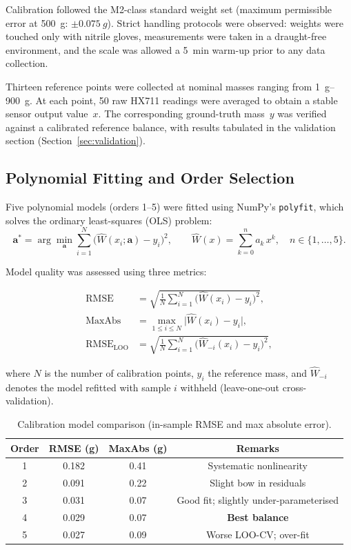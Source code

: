 \documentclass[12pt,a4paper]{article}
\begin{document}
Calibration followed the M2-class standard weight set (maximum permissible error at
\SI{500}{g}: $\pm\SI{0.075}{g}$). Strict handling protocols were observed: weights were
touched only with nitrile gloves, measurements were taken in a draught-free environment,
and the scale was allowed a \SI{5}{min} warm-up prior to any data collection.

Thirteen reference points were collected at nominal masses ranging from
\SIrange{1}{900}{g}. At each point, 50 raw HX711 readings were averaged to obtain a
stable sensor output value~$x$. The corresponding ground-truth mass~$y$ was verified
against a calibrated reference balance, with results tabulated in the validation section
(Section~\ref{sec:validation}).

\subsection{Polynomial Fitting and Order Selection}

Five polynomial models (orders 1--5) were fitted using NumPy's \texttt{polyfit}, which
solves the ordinary least-squares (OLS) problem:
\begin{equation}
  \mathbf{a}^* = \arg\min_{\mathbf{a}}\sum_{i=1}^{N}\bigl(\hat{W}(x_i;\mathbf{a}) - y_i\bigr)^2,
  \qquad \hat{W}(x) = \sum_{k=0}^{n} a_k \, x^k,\quad n \in \{1,\ldots,5\}.
  \label{eq:ols}
\end{equation}

Model quality was assessed using three metrics:

\begin{align}
  \text{RMSE} &= \sqrt{\frac{1}{N}\sum_{i=1}^{N}\bigl(\hat{W}(x_i) - y_i\bigr)^2},
  \label{eq:rmse} \\[4pt]
  \text{MaxAbs} &= \max_{1\le i\le N}\bigl|\hat{W}(x_i) - y_i\bigr|,
  \label{eq:maxabs} \\[4pt]
  \text{RMSE}_\text{LOO} &= \sqrt{\frac{1}{N}\sum_{i=1}^{N}\bigl(\hat{W}_{-i}(x_i) - y_i\bigr)^2},
  \label{eq:loocv}
\end{align}

where $N$ is the number of calibration points, $y_i$ the reference mass, and
$\hat{W}_{-i}$ denotes the model refitted with sample $i$ withheld (leave-one-out
cross-validation).

\begin{table}[H]
\centering
\caption{Calibration model comparison (in-sample RMSE and max absolute error).}
\label{tab:poly_compare}
\begin{tabular}{@{}cccc@{}}
\toprule
\textbf{Order} & \textbf{RMSE (g)} & \textbf{MaxAbs (g)} & \textbf{Remarks} \\
\midrule
1 & 0.182 & 0.41 & Systematic nonlinearity \\
2 & 0.091 & 0.22 & Slight bow in residuals \\
3 & 0.031 & 0.07 & Good fit; slightly under-parameterised \\
4 & 0.029 & 0.07 & \textbf{Best balance} \\
5 & 0.027 & 0.09 & Worse LOO-CV; over-fit \\
\bottomrule
\end{tabular}
\end{table}
\end{document}
